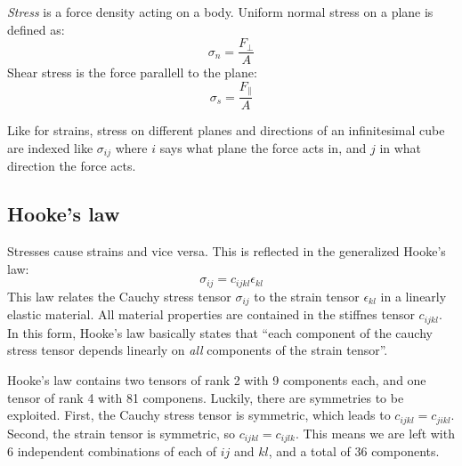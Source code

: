 \emph{Stress} is a force density acting on a body. Uniform normal stress on a plane is defined as:
\begin{equation}
	\sigma_n = \frac{F_\perp}{A}
\end{equation}
Shear stress is the force parallell to the plane:
\begin{equation}
	\sigma_s = \frac{F_\parallel}{A}
\end{equation}

Like for strains, stress on different planes and directions of an infinitesimal cube are indexed like $\sigma_{ij}$ where $i$ says what plane the force acts in, and $j$ in what direction the force acts.

\subsection{Hooke's law}
Stresses cause strains and vice versa. This is reflected in the generalized Hooke's law:
\begin{equation}
	\sigma_{ij} = c_{ijkl}\epsilon_{kl}
\end{equation}
This law relates the Cauchy stress tensor $\sigma_{ij}$ to the strain tensor $\epsilon_{kl}$ in a linearly elastic material. All material properties are contained in the stiffnes tensor $c_{ijkl}$.
In this form, Hooke's law basically states that ``each component of the cauchy stress tensor depends linearly on \emph{all} components of the strain tensor''. 

Hooke's law contains two tensors of rank 2 with 9 components each, and one tensor of rank 4 with 81 componens. Luckily, there are symmetries to be exploited. First, the Cauchy stress tensor is symmetric, which leads to $c_{ijkl} = c_{jikl}$. Second, the strain tensor is symmetric, so $c_{ijkl} = c_{ijlk}$. This means we are left with 6 independent combinations of each of $ij$ and $kl$, and a total of 36 components. 

